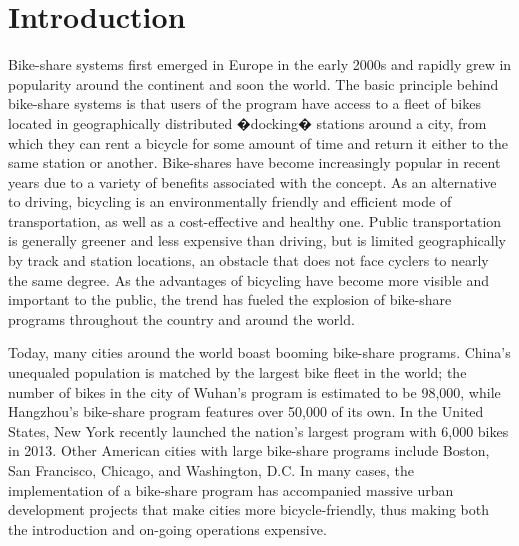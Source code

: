 \documentclass{sig-alternate}
\begin{document}
\section{Introduction}
\label{sec:intro}
Bike-share systems first emerged in Europe in the early 2000s and rapidly grew in popularity around the continent and soon the world. The basic principle behind bike-share systems is that users of the program have access to a fleet of bikes located in geographically distributed �docking� stations around a city, from which they can rent a bicycle for some amount of time and return it either to the same station or another. Bike-shares have become increasingly popular in recent years due to a variety of benefits associated with the concept. As an alternative to driving, bicycling is an environmentally friendly and efficient mode of transportation, as well as a cost-effective and healthy one. Public transportation is generally greener and less expensive than driving, but is limited geographically by track and station locations, an obstacle that does not face cyclers to nearly the same degree. As the advantages of bicycling have become more visible and important to the public, the trend has fueled the explosion of bike-share programs throughout the country and around the world. \newline

Today, many cities around the world boast booming bike-share programs. China's unequaled population is matched by the largest bike fleet in the world; the number of bikes in the city of Wuhan's program is estimated to be 98,000, while Hangzhou's bike-share program features over 50,000 of its own. In the United States, New York recently launched the nation's largest program with 6,000 bikes in 2013. Other American cities with large bike-share programs include Boston, San Francisco, Chicago, and Washington, D.C. In many cases, the implementation of a bike-share program has accompanied massive urban development projects that make cities more bicycle-friendly, thus making both the introduction and on-going operations expensive. \newline
\end{document}
